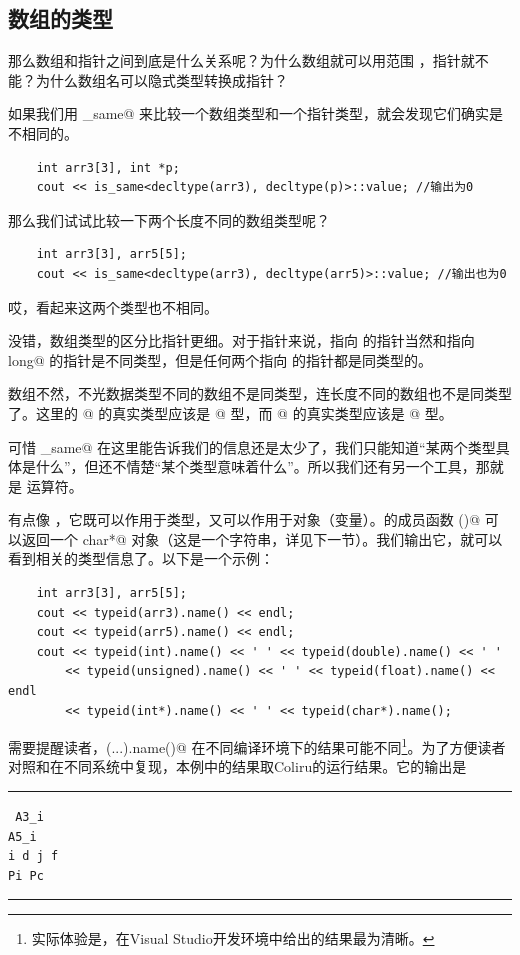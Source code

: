 \subsection*{数组的类型}
那么数组和指针之间到底是什么关系呢？为什么数组就可以用范围 \lstinline@for@，指针就不能？为什么数组名可以隐式类型转换成指针？\par
如果我们用 \lstinline@is_same@ 来比较一个数组类型和一个指针类型，就会发现它们确实是不相同的。
\begin{lstlisting}
    int arr3[3], int *p;
    cout << is_same<decltype(arr3), decltype(p)>::value; //输出为0
\end{lstlisting}
那么我们试试比较一下两个长度不同的数组类型呢？
\begin{lstlisting}
    int arr3[3], arr5[5];
    cout << is_same<decltype(arr3), decltype(arr5)>::value; //输出也为0
\end{lstlisting}
哎，看起来这两个类型也不相同。\par
没错，数组类型的区分比指针更细。对于指针来说，指向 \lstinline@int@ 的指针当然和指向 \lstinline@long long@ 的指针是不同类型，但是任何两个指向 \lstinline@int@ 的指针都是同类型的。\par
数组不然，不光数据类型不同的数组不是同类型，连长度不同的数组也不是同类型了。这里的 @ 的真实类型应该是 \lstinline@int[3]@ 型，而 @ 的真实类型应该是 \lstinline@int[5]@ 型。\par
可惜 \lstinline@is_same@ 在这里能告诉我们的信息还是太少了，我们只能知道``某两个类型具体是什么''，但还不情楚``某个类型意味着什么''。所以我们还有另一个工具，那就是 \lstinline@typeid@ 运算符。\par
\lstinline@typeid@ 有点像 \lstinline@sizeof@，它既可以作用于类型，又可以作用于对象（变量）。\lstinline@typeid@ 的成员函数 \lstinline@name()@ 可以返回一个 \lstinline@const char*@ 对象（这是一个字符串，详见下一节）。我们输出它，就可以看到相关的类型信息了。以下是一个示例：
\begin{lstlisting}
    int arr3[3], arr5[5];
    cout << typeid(arr3).name() << endl;
    cout << typeid(arr5).name() << endl;
    cout << typeid(int).name() << ' ' << typeid(double).name() << ' '
        << typeid(unsigned).name() << ' ' << typeid(float).name() << endl
        << typeid(int*).name() << ' ' << typeid(char*).name();
\end{lstlisting}
需要提醒读者，\lstinline@typeid(...).name()@ 在不同编译环境下的结果可能不同\footnote{实际体验是，在Visual Studio开发环境中给出的结果最为清晰。}。为了方便读者对照和在不同系统中复现，本例中的结果取Coliru的运行结果。它的输出是\\\noindent\rule{\linewidth}{.2pt}\texttt{
A3\_i\\
A5\_i\\
i d j f\\
Pi Pc
}\\\noindent\rule{\linewidth}{.2pt}\par
